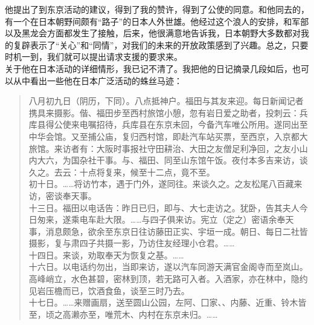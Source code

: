 他提出了到东京活动的建议，得到了我的赞许，得到了公使的同意。和他同去的，有一个在日本朝野间颇有“路子”的日本人外世雄。他经过这个浪人的安排，和军部以及黑龙会方面都发生了接触，后来，他很满意地告诉我，日本朝野大多数都对我的复辟表示了“关心”和“同情”，对我们的未来的开放政策感到了兴趣。总之，只要时机一到，我们就可以提出请求支援的要求来。\\

关于他在日本活动的详细情形，我已记不清了。我把他的日记摘录几段如后，也可以从中看出一些他在日本广泛活动的蛛丝马迹：\\

\begin{quote}
	八月初九日（阴历，下同）。八点抵神户。福田与其友来迎。每日新闻记者携具来摄影。偕、福田步至西村旅馆小憩，忽有岩日爱之助者，投刺云：兵库县得公使来电嘱招待，兵库县在东京未回，今备汽车唯公所用。遂同出至中华会馆。又至捕公庙，复归西村馆，即赴汽车站买票，至西京，入京都大旅馆。来访者有：大阪时事报社守田耕治、大田之友僧足利净回，之友小山内大六，为国杂社干事。与、福田、同至山东馆午饭。夜付本多吉来访，谈久之。去云：十点将复来，候至十二点，竟不至。\\

初十日。……将访竹本，遇于门外，遂同往。来谈久之。之友松尾八百藏来访，密谈奉天事。\\

十三日。福田以电话告：昨日已归，即与、大七走访之。犹卧，告其夫人今日匆来，遂乘电车赴大限。……与四子俱来访。宪立（定之）密语余奉天事，消息颇急，欲余至东京日往访藤田正实、宇垣一成。朝日、每日二社皆摄影，复与肃四子共摄一影，乃访住友经理小仓君。……\\

十四日。来谈，劝取奉天为恢复之基。……\\

十六日。以电话约勿出，当即来访，遂以汽车同游天满官金阁寺而至岚山。高峰峭立，水色甚碧，密林到顶，若无路可入者。入酒家，亦在林中，隐约见岩压檐而已，饮酒食鱼，谈至三时乃去。\\

十七日。……来赠画扇，送至圆山公园，左阿、囗家、、内藤、近重、铃木皆至，顷之高濑亦至，唯荒木、内村在东京未归。……\\


\end{quote}
